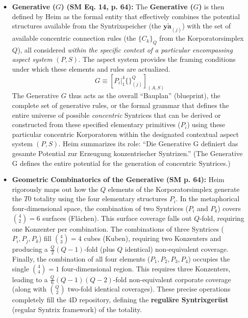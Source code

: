 \documentclass[12pt]{article}
\newcommand{\q}[1]{\enquote{#1}}
\newcommand{\aspektivsystem}{P}
\newcommand{\subjektiveraspekt}{S}
\newcommand{\elementarstruktur}{\bm{y\widetilde{a}}_{(j)}}
\newcommand{\generative}{G}
\begin{document}
\begin{itemize}
    \item \textbf{Generative (\( \generative \)) (SM Eq. 14, p. 64):}
    The \textbf{Generative (\( \generative \))} is then defined by Heim as the formal entity that effectively combines the potential structures available from the Syntrixspeicher (the \( \elementarstruktur \)) with the set of available concentric connection rules (the \( \{C_k\}_Q \) from the Korporatorsimplex \( Q \)), all considered \textit{within the specific context of a particular encompassing aspect system \((\aspektivsystem,\subjektiveraspekt)\)}. The aspect system provides the framing conditions under which these elements and rules are actualized.
    \begin{equation}
    \generative \equiv \left[ P_i \big|_1^4 \{ \}_{(j)}^Q \right]_{(A,S)}
    \label{eq:original_generative}
    \end{equation}
    The Generative \( \generative \) thus acts as the overall \q{Bauplan} (blueprint), the complete set of generative rules, or the formal grammar that defines the entire universe of possible \textit{concentric} Syntrices that can be derived or constructed from these specified elementary primitives (\( P_i \)) using these particular concentric Korporatoren within the designated contextual aspect system \((\aspektivsystem,\subjektiveraspekt)\). Heim summarizes its role: \q{Die Generative G definiert das gesamte Potential zur Erzeugung konzentrischer Syntrizen.} (The Generative G defines the entire potential for the generation of concentric Syntrices.)

    \item \textbf{Geometric Combinatorics of the Generative (SM p. 64):}
    Heim rigorously maps out how the \(Q\) elements of the Korporatorsimplex generate the \(T0\) totality using the four elementary structures \(P_i\). In the metaphorical four-dimensional space, the combination of two Syntrices (\(P_i\) and \(P_k\)) covers \(\binom{4}{2} = 6\) surfaces (Flächen). This surface coverage falls out \(Q\)-fold, requiring one Konzenter per combination. The combinations of three Syntrices (\(P_i, P_j, P_k\)) fill \(\binom{4}{3} = 4\) cubes (Kuben), requiring two Konzenters and producing a \(\frac{Q}{2}(Q-1)\)-fold (plus \(Q\) identical) non-equivalent coverage. Finally, the combination of all four elements (\(P_1, P_2, P_3, P_4\)) occupies the single \(\binom{4}{4} = 1\) four-dimensional region. This requires three Konzenters, leading to a \(\frac{Q}{6}(Q-1)(Q-2)\)-fold non-equivalent corporate coverage (along with \(\binom{Q}{2}\) two-fold identical coverages). These precise operations completely fill the 4D repository, defining the \textbf{reguläre Syntrixgerüst} (regular Syntrix framework) of the totality.


\end{itemize}
\end{document}
